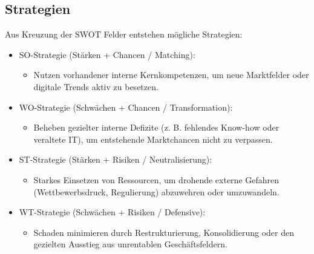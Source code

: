 \documentclass[a4paper]{article}
\begin{document}
    \subsection{Strategien}
    Aus Kreuzung der SWOT Felder entstehen mögliche Strategien:
    \begin{itemize}
        \item SO-Strategie (Stärken + Chancen / Matching):
        \begin{itemize}
            \item Nutzen vorhandener interne Kernkompetenzen, um neue Marktfelder oder digitale Trends aktiv zu besetzen.
        \end{itemize}
        \item  WO-Strategie (Schwächen + Chancen / Transformation):
        \begin{itemize}
            \item Beheben gezielter interne Defizite (z. B. fehlendes Know-how oder veraltete IT), um entstehende Marktchancen nicht zu verpassen.
        \end{itemize}
        \item ST-Strategie (Stärken + Risiken / Neutralisierung):
        \begin{itemize}
            \item Starkes Einsetzen von Ressourcen, um drohende externe Gefahren (Wettbewerbsdruck, Regulierung) abzuwehren oder umzuwandeln.
        \end{itemize}
        \item WT-Strategie (Schwächen + Risiken / Defensive):
        \begin{itemize}
            \item Schaden minimieren  durch Restrukturierung, Konsolidierung oder den gezielten Ausstieg aus unrentablen Geschäftsfeldern.
        \end{itemize}
    \end{itemize}
    
\end{document}
